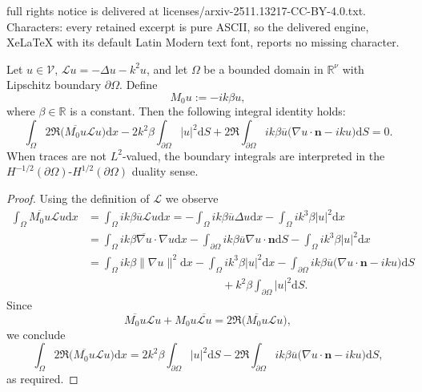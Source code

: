 \documentclass[10pt,a4paper]{amsart}
\def\L{{\mathscr{L}}}
\def\Vc{{\mathscr V}}
\def\dimx{\nu }
\def\d{{\mathrm d}}
\renewcommand{\vec}[1]{\boldsymbol{#1}}
\begin{document}
full rights notice is delivered at licenses/arxiv-2511.13217-CC-BY-4.0.txt. Characters: every retained excerpt is pure ASCII, so the delivered engine, XeLaTeX with its default Latin Modern text font, reports no missing character.
\begin{proposition}
  \label{the:boundarymorawetz}
  Let $u\in \Vc$, $\L u = -\Delta u - k^2 u$, and let $\Omega$ be {a bounded} domain in $\mathbb{R}^\dimx$ 
  with Lipschitz boundary $\partial \Omega$. 
  Define
  \begin{equation}  \label{eq:multM0}
    M_0 u :=  - i k \beta  u,
  \end{equation}
  where $\beta \in \mathbb{R}$ is a constant. Then the following integral identity holds:
 \begin{equation} \label {M0}
    \int_\Omega  2  \Re  \big( \overline{M_0 u}  \L  u\big)    \d x
     -    2 k ^2 \beta  \int_{\partial \Omega}   |u|^2    \d S       
     +  2  \Re   \int_{\partial \Omega} i k \beta   \overline{u}   \Big ( \nabla u \cdot \vec{n}
          -ik   u \Big )    \d S  =  0.
  \end{equation}
  {When traces are not $L^2$-valued, the boundary integrals are interpreted in the $H^{-1/2}(\partial\Omega)$-$H^{1/2}(\partial\Omega)$ duality sense.}
\end{proposition}

\begin{proof}
Using the definition of $\L$ we observe
\begin{align*} 
    \int_\Omega \overline{M_0 u}  \L  u    \d x
    &=    \int_\Omega i k \beta   \overline{u}  \L  u    \d x
      =  -   \int_\Omega i k \beta   \overline{u}  \Delta u    \d x  -   \int_\Omega i k^3 \beta   |u|^2    \d x
      \\
    &=  \int_\Omega i k \beta   \overline{\nabla  u} \cdot \nabla u    \d x  -   \int_{\partial \Omega} i k \beta   \overline{u}  \nabla u \cdot \vec{n}   \d S
        -   \int_\Omega i k^3 \beta   |u|^2    \d x
        \\
   &=  \int_\Omega i k \beta   \|\nabla u\|^2   \d x 
        -   \int_\Omega i k^3 \beta   |u|^2    \d x  -   \int_{\partial \Omega} i k \beta   \overline{u}   \Big ( \nabla u \cdot \vec{n}
          -ik   u \Big )    \d S\\
   &\qquad\qquad\qquad\qquad\qquad\qquad +  k ^2 \beta  \int_{\partial \Omega} |u|^2    \d S  .
\end{align*}
Since 
\[
\overline{M_0 u}  \L  u + M_0 u  \overline{\L  u}= 2  \Re  \big( \overline{M_0 u}  \L  u\big),
\]
we conclude
\begin{equation*}
    \int_\Omega  2  \Re  \big( \overline{M_0 u}  \L  u\big)    \d x
     =     2 k ^2 \beta  \int_{\partial \Omega} |u|^2    \d S
         -  2  \Re   \int_{\partial \Omega} i k \beta   \overline{u}  \Big ( \nabla u \cdot \vec{n}
          -ik   u \Big )    \d S ,
\end{equation*}
as required.
\end{proof}
\end{document}
